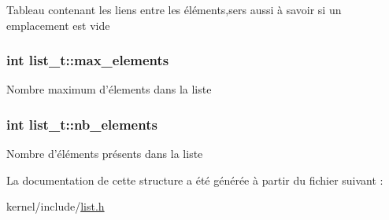 \-Tableau contenant les liens entre les éléments,sers aussi à savoir si un emplacement est vide \hypertarget{structlist__t_a646f05091de2a2667b0f3c9aaffdfbdc}{
\subsubsection[{max\-\_\-elements}]{\setlength{\rightskip}{0pt plus 5cm}int {\bf list\-\_\-t\-::max\-\_\-elements}}}\label{structlist__t_a646f05091de2a2667b0f3c9aaffdfbdc}
\-Nombre maximum d'élements dans la liste \hypertarget{structlist__t_a21f815dfb80c00df4cc95304bc29161f}{
\subsubsection[{nb\-\_\-elements}]{\setlength{\rightskip}{0pt plus 5cm}int {\bf list\-\_\-t\-::nb\-\_\-elements}}}\label{structlist__t_a21f815dfb80c00df4cc95304bc29161f}
\-Nombre d'éléments présents dans la liste 

\-La documentation de cette structure a été générée à partir du fichier suivant \-:\begin{DoxyCompactItemize}
\item 
kernel/include/\hyperlink{list_8h}{list.\-h}\end{DoxyCompactItemize}
